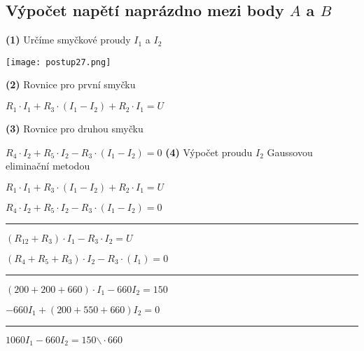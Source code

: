 \documentclass[a4paper,12pt]{article}
\begin{document}
\subsection{Výpočet napětí naprázdno mezi body $A$ a $B$}\par
\hspace{1em}\textbf{(1)} Určíme smyčkové proudy $I_1$ a $I_2$\par\vspace{0.8em}
\texttt{[image: postup27.png]}\par\vspace{1.5em}
\hspace{1em}\textbf{(2)} Rovnice pro první smyčku\par
$R_1\cdot I_1+R_3\cdot (I_1-I_2)+R_2\cdot I_1=U$\par\vspace{0.8em}
\hspace{1em}\textbf{(3)} Rovnice pro druhou smyčku\par
$R_4\cdot I_2+R_5\cdot I_2-R_3\cdot (I_1-I_2)=0$\newpage
\hspace{1em}\textbf{(4)} Výpočet proudu $I_2$ Gaussovou eliminační metodou\par
$R_1\cdot I_1+R_3\cdot (I_1-I_2)+R_2\cdot I_1=U$\par
$R_4\cdot I_2+R_5\cdot I_2-R_3\cdot (I_1-I_2)=0$\par
\vspace{-8pt}\noindent\rule{7cm}{0.5pt}\par
\hspace{1em}$(R_{12}+R_3)\cdot I_1-R_3\cdot I_2=U$\par
\hspace{1em}$(R_4+R_5+R_3)\cdot I_2-R_3\cdot (I_1)=0$\par
\vspace{-8pt}\hspace{1em}\noindent\rule{7cm}{0.5pt}\par
\hspace{2em}$(200+200+660)\cdot I_1-660I_2=150$\par
\hspace{2em}$-660I_1+(200+550+660)I_2=0$\par
\vspace{-8pt}\hspace{2em}\noindent\rule{7cm}{0.5pt}\par
\hspace{3em}$1060I_1-660I_2=150$\hspace{1.5em}$\backslash\cdot 660$\par
\end{document}
